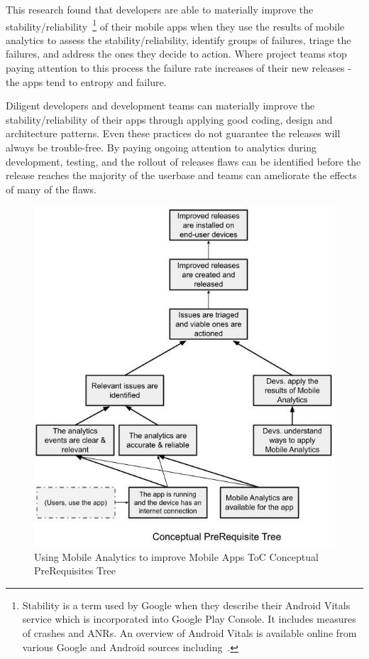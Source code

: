 This research found that developers are able to materially improve the stability/reliability~\footnote{Stability is a term used by Google when they describe their Android Vitals service which is incorporated into Google Play Console. It includes measures of crashes and ANRs. An overview of Android Vitals is available online from various Google and Android sources including~\citep{android_vitals_overview_2019, android_vitals_best_practices}.}
%
of their mobile apps when they use the results of mobile analytics to assess the stability/reliability, identify groups of failures, triage the failures, and address the ones they decide to action. Where project teams stop paying attention to this process the failure rate increases of their new releases - the apps tend to entropy and failure.

Diligent developers and development teams can materially improve the stability/reliability of their apps through applying good coding, design and architecture patterns. Even these practices do not guarantee the releases will always be trouble-free. By paying ongoing attention to analytics during development, testing, and the rollout of releases flaws can be identified before the release reaches the majority of the userbase and teams can ameliorate the effects of many of the flaws.

\newpage 

\begin{figure}
    \centering
    \includegraphics[width=15cm]{images/my/Conceptual_prereq_tree_Applying_Theory_of_Constraints_to_using_Mobile_Analytics_to_improve_Mobile_Apps.jpeg}
    \caption{Using Mobile Analytics to improve Mobile Apps ToC Conceptual PreRequisites Tree}
    \label{fig:using-toc-cpt-using-mobile-analytics-to-improve-mobile-apps}
\end{figure}

